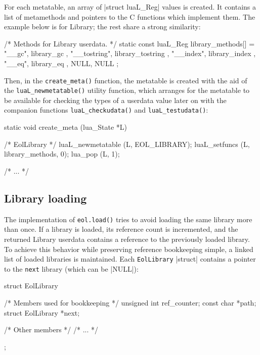 For each metatable, an array of \Mc|struct luaL_Reg| values is created. It
contains a list of metamethods and pointers to the C functions which implement
them. The example below is for \textsf{Library}; the rest share a strong
similarity:

\begin{ccode}
/* Methods for Library userdata. */
static const luaL_Reg library_methods[] = {
    { "__gc",       library_gc       },
    { "__tostring", library_tostring },
    { "__index",    library_index    },
    { "__eq",       library_eq       },
    { NULL, NULL }
};
\end{ccode}

Then, in the \verb|create_meta()| function, the metatable is created with the
aid of the \verb|luaL_newmetatable()| utility function, which arranges for the
metatable to be available for checking the types of a userdata value later on
with the companion functions \verb|luaL_checkudata()| and
\verb|luaL_testudata()|:

\begin{ccode}
static void
create_meta (lua_State *L) {
    /* EolLibrary */
    luaL_newmetatable (L, EOL_LIBRARY);
    luaL_setfuncs (L, library_methods, 0);
    lua_pop (L, 1);

    /* ... */
}
\end{ccode}


\subsection{Library loading}

The implementation of \verb|eol.load()| tries to avoid loading the same
library more than once. If a library is loaded, its reference count is
incremented, and the returned \textsf{Library} userdata contains a reference
to the previously loaded library. To achieve this behavior while preserving
reference bookkeeping simple, a linked list of loaded libraries is maintained.
Each \verb|EolLibrary| \Mc|struct| contains a pointer to the \verb|next|
library (which can be \Mc|NULL|):

\begin{ccode}
struct EolLibrary {
  /* Members used for bookkeeping */
  unsigned int       ref_counter;
  const char        *path;
  struct EolLibrary *next;

  /* Other members */
  /* ... */
};
\end{ccode}

